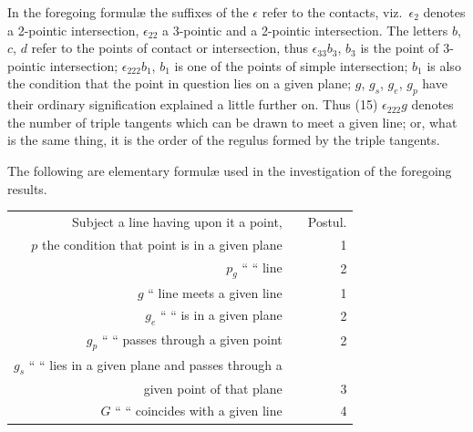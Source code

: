 \documentclass[11pt,a4paper,english]{article}
\theoremstyle{plain}
\begin{document}
In the foregoing formul\ae{} the suffixes of the $\epsilon$ refer to the contacts, viz.\ $\epsilon_2$ denotes a 2-pointic intersection, $\epsilon_{22}$ a 3-pointic and a 2-pointic intersection. The letters $b$, $c$, $d$ refer to the points of contact or intersection, thus $\epsilon_{33}b_3$, $b_3$ is the point of 3-pointic intersection; $\epsilon_{222}b_1$, $b_1$ is one of the points of simple intersection; $b_1$ is also the condition that the point in question lies on a given plane; $g$, $g_s$, $g_e$, $g_p$ have their ordinary signification explained a little further on. Thus (15) $\epsilon_{222}g$ denotes the number of triple tangents which can be drawn to meet a given line; or, what is the same thing, it is the order of the regulus formed by the triple tangents.

The following are elementary formul\ae{} used in the investigation of the foregoing results.

\begin{center}
\begin{tabular}{r @{\quad} l @{\qquad} r}
Subject a line having upon it a point, & & Postul. \\[2pt]
$p$ the condition that point is in a given plane & & 1 \\
$p_g$ \hspace{2em} `` \hspace{3em} `` \hspace{3em} line & & 2 \\
$g$ \hspace{2em} `` \hspace{1.5em} line meets a given line & & 1 \\
$g_e$ \hspace{2em} `` \hspace{3em} `` \hspace{1.5em} is in a given plane & & 2 \\
$g_p$ \hspace{2em} `` \hspace{3em} `` \hspace{1.5em} passes through a given point & & 2 \\
$g_s$ \hspace{2em} `` \hspace{3em} `` \hspace{1.5em} lies in a given plane and passes through a & & \\
\hspace{2em} given point of that plane & & 3 \\
$G$ \hspace{2em} `` \hspace{3em} `` \hspace{1.5em} coincides with a given line & & 4 \\[4pt]
\end{tabular}
\end{center}
\end{document}
